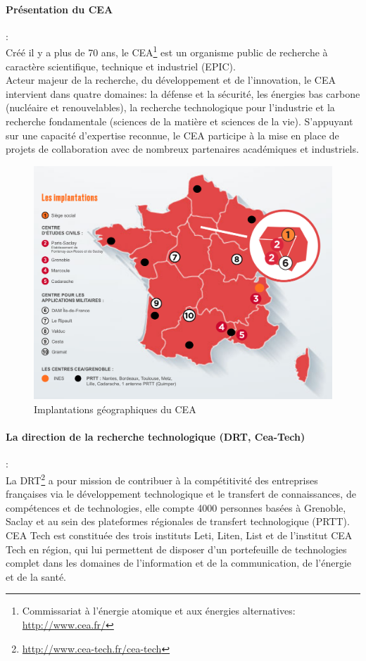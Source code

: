 \documentclass[11pt, headsepline, a4paper, fleqn, oneside]{article}
\begin{document}
\paragraph{Présentation du CEA}: \\
Créé il y a plus de 70 ans, le CEA\footnote{Commissariat à l'énergie atomique et aux énergies alternatives: \url{http://www.cea.fr/}} est un organisme public de recherche à caractère scientifique, technique et industriel (EPIC).\\
Acteur majeur de la recherche, du développement et de l'innovation, le CEA intervient dans quatre domaines: la défense et la sécurité, les énergies bas carbone (nucléaire et renouvelables), la recherche technologique pour l'industrie et la recherche fondamentale (sciences de la matière et sciences de la vie). S'appuyant sur une capacité d'expertise reconnue, le CEA participe à la mise en place de projets de collaboration avec de nombreux partenaires académiques et industriels.
\begin{figure}[ht]
    \centering
    \includegraphics[width = 0.6\linewidth]{cea.png}
    \caption{Implantations géographiques du CEA}
\end{figure}
\paragraph{La direction de la recherche technologique (DRT, Cea-Tech)}:\\
La DRT\footnote{\url{http://www.cea-tech.fr/cea-tech}} a pour mission de contribuer à la compétitivité des entreprises françaises via le développement technologique et le transfert de connaissances, de compétences et de technologies, elle compte 4000 personnes basées à Grenoble, Saclay et au sein des plateformes régionales de transfert technologique (PRTT). CEA Tech est constituée des trois instituts Leti, Liten, List et de l’institut CEA Tech en région, qui lui permettent de disposer d’un portefeuille de technologies complet dans les domaines de l’information et de la communication, de l’énergie et de la santé.
\end{document}
